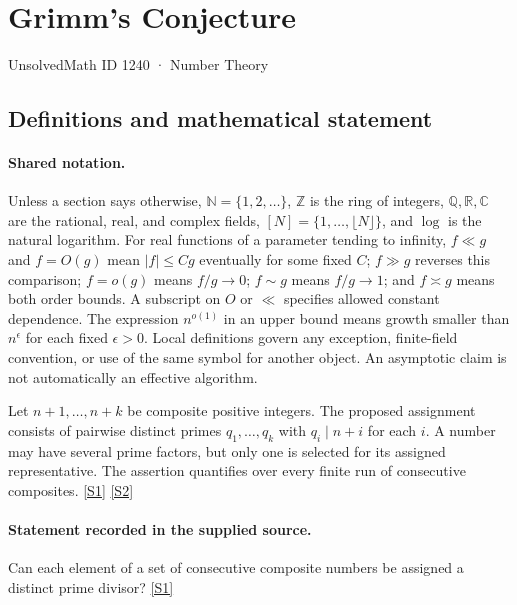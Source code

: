 \documentclass[11pt,a4paper]{article}
\newcommand{\N}{\mathbb{N}}
\newcommand{\Z}{\mathbb{Z}}
\newcommand{\Q}{\mathbb{Q}}
\newcommand{\R}{\mathbb{R}}
\newcommand{\C}{\mathbb{C}}
\newcommand{\sref}[2]{\hyperlink{source:#1:#2}{[S#2]}}
\begin{document}

\setcounter{section}{1239}

\section{Grimm's Conjecture}\label{1240}

{\small\sffamily UnsolvedMath ID 1240 · Number Theory}

\subsection{Definitions and mathematical statement}

\paragraph{Shared notation.}Unless a section says otherwise, $\N=\{1,2,\ldots\}$,
$\Z$ is the ring of integers, $\Q,\R,\C$ are the rational, real, and complex
fields, $[N]=\{1,\ldots,\lfloor N\rfloor\}$, and $\log$ is the natural
logarithm. For real functions of a parameter tending to infinity,
$f\ll g$ and $f=O(g)$ mean $|f|\leq Cg$ eventually for some fixed $C$;
$f\gg g$ reverses this comparison; $f=o(g)$ means $f/g\to0$;
$f\sim g$ means $f/g\to1$; and $f\asymp g$ means both order bounds.
A subscript on $O$ or $\ll$ specifies allowed constant dependence.
The expression $n^{o(1)}$ in an upper bound means growth smaller than
$n^\epsilon$ for each fixed $\epsilon>0$. Local definitions govern any
exception, finite-field convention, or use of the same symbol for another
object. An asymptotic claim is not automatically an effective algorithm.



Let $n+1,\ldots,n+k$ be composite positive integers. The proposed assignment consists of pairwise distinct primes $q_1,\ldots,q_k$ with $q_i\mid n+i$ for each $i$. A number may have several prime factors, but only one is selected for its assigned representative. The assertion quantifies over every finite run of consecutive composites. \sref{1240}{1} \sref{1240}{2}

\paragraph{Statement recorded in the supplied source.}
Can each element of a set of consecutive composite numbers be assigned a distinct prime divisor? \sref{1240}{1}
\end{document}
